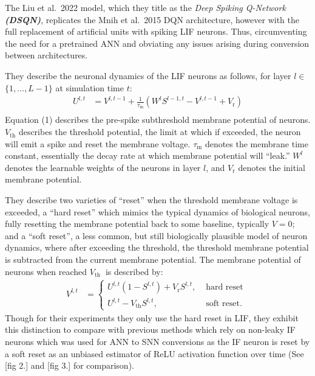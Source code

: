 \documentclass[
]{article}
\begin{document}
The Liu et al.~2022 model, which they title as the \emph{Deep Spiking
Q-Network \textbf{(DSQN)}}, replicates the Mnih et al.~2015 DQN
architecture, however with the full replacement of artificial units with
spiking LIF neurons. Thus, circumventing the need for a pretrained ANN
and obviating any issues arising during conversion between
architectures.

They describe the neuronal dynamics of the LIF neurons as follows, for
layer \(l \in\) \(\{1, \ldots, L-1\}\) at simulation time \(t\): \[
\begin{aligned}
U^{l, t} & =V^{l, t-1}+\frac{1}{\tau_{\mathrm{m}}}\left(W^l S^{l-1, t}-V^{l, t-1}+V_{\mathrm{r}}\right) \\
\end{aligned}
\] Equation (1) describes the pre-spike subthreshold membrane potential
of neurons. \(V_{\mathrm{th}}\) describes the threshold potential, the
limit at which if exceeded, the neuron will emit a spike and reset the
membrane voltage. \(\tau_{\mathrm{m}}\) denotes the membrane time
constant, essentially the decay rate at which membrane potential will
``leak.'' \(W^l\) denotes the learnable weights of the neurons in layer
\(l\), and \(V_{\mathrm{r}}\) denotes the initial membrane potential.

They describe two varieties of ``reset'' when the threshold membrane
voltage is exceeded, a ``hard reset'' which mimics the typical dynamics
of biological neurons, fully resetting the membrane potential back to
some baseline, typically \(V = 0\); and a ``soft reset'', a less common,
but still biologically plausible model of neuron dynamics, where after
exceeding the threshold, the threshold membrane potential is subtracted
from the current membrane potential. The membrane potential of neurons
when reached \(V_{\text {th }}\) is described by: \[
\begin{aligned}
V^{l, t} & = \begin{cases}U^{l, t}\left(1-S^{l, t}\right)+V_{\mathrm{r}} S^{l, t}, & \text { hard reset } \\
U^{l, t}-V_{\mathrm{th}} S^{l, t}, & \text { soft reset. }\end{cases}
\end{aligned}
\] Though for their experiments they only use the hard reset in LIF,
they exhibit this distinction to compare with previous methods which
rely on non-leaky IF neurons which was used for ANN to SNN conversions
as the IF neuron is reset by a soft reset as an unbiased estimator of
ReLU activation function over time (See {[}fig 2.{]} and {[}fig 3.{]}
for comparison).
\end{document}
